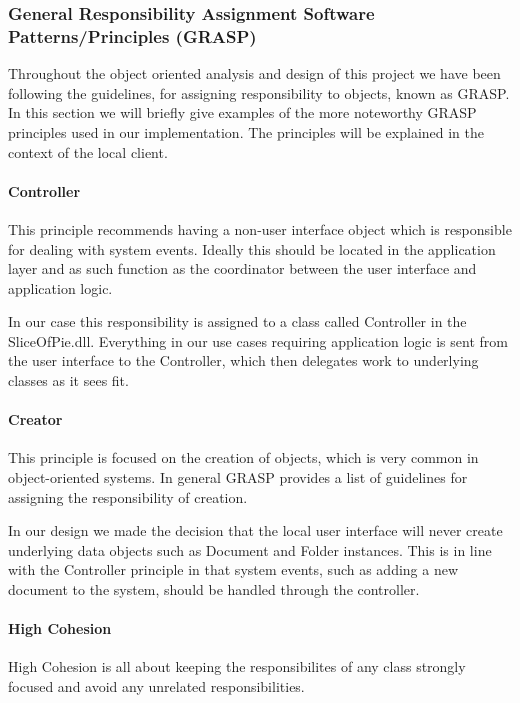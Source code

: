 \subsubsection{General Responsibility Assignment Software Patterns/Principles (GRASP)}
\label{sec:GRASP}

Throughout the object oriented analysis and design of this project we have been following the guidelines, for assigning responsibility to objects,  known as GRASP.
In this section we will briefly give examples of the more noteworthy GRASP principles used in our implementation. The principles will be explained in the context of the local client.

\paragraph{Controller}
This principle recommends having a non-user interface object which is responsible for dealing with system events. Ideally this should  be located in the application layer and as such function as the coordinator between the user interface and application logic.

In our case this responsibility is assigned to a class called Controller in the SliceOfPie.dll. Everything in our use cases requiring application logic is sent from the user interface to the Controller, which then delegates work to underlying classes as it sees fit.

\paragraph{Creator}
This principle is focused on the creation of objects, which is very common in object-oriented systems. In general GRASP provides a list of guidelines for assigning the responsibility of creation.

In our design we made the decision that the local user interface will never create underlying data objects such as Document and Folder instances. This is in line with the Controller principle in that system events, such as adding a new document to the system, should be handled through the controller.

\paragraph{High Cohesion}
High Cohesion is all about keeping the responsibilites of any class strongly focused and avoid any unrelated responsibilities. 

